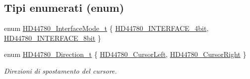 \subsection*{Tipi enumerati (enum)}
\begin{DoxyCompactItemize}
\item 
enum \hyperlink{group___h_d44780_gaaaea8b73e24f7658da4118f6b01b45f0}{H\+D44780\+\_\+\+Interface\+Mode\+\_\+t} \{ \hyperlink{group___h_d44780_ggaaaea8b73e24f7658da4118f6b01b45f0a45bf6ce7ec7c951f692bdce9f0f485c6}{H\+D44780\+\_\+\+I\+N\+T\+E\+R\+F\+A\+C\+E\+\_\+4bit}, 
\hyperlink{group___h_d44780_ggaaaea8b73e24f7658da4118f6b01b45f0a24da9b234f9358c14184fe21f3c47de5}{H\+D44780\+\_\+\+I\+N\+T\+E\+R\+F\+A\+C\+E\+\_\+8bit}
 \}
\item 
enum \hyperlink{group___h_d44780_gaf46f4db4f981d3a1088804a6d6980d30}{H\+D44780\+\_\+\+Direction\+\_\+t} \{ \hyperlink{group___h_d44780_ggaf46f4db4f981d3a1088804a6d6980d30aa4d704398d4edd1e0dec8dbb55f90292}{H\+D44780\+\_\+\+Cursor\+Left}, 
\hyperlink{group___h_d44780_ggaf46f4db4f981d3a1088804a6d6980d30a26006ced693b6bab28c6e30bfdb8c399}{H\+D44780\+\_\+\+Cursor\+Right}
 \}
\begin{DoxyCompactList}\small\item\em Direzioni di spostamento del cursore. \end{DoxyCompactList}\end{DoxyCompactItemize}
